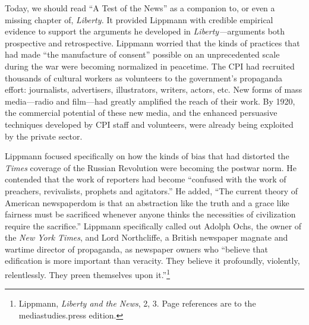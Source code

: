 \documentclass[openany,nobib,twoside,nohyper]{tufte-book}
\begin{document}
Today, we should read ``A Test of the News'' as a companion to, or even
a missing chapter of, \emph{Liberty.} It provided Lippmann with credible
empirical evidence to support the arguments he developed in
\emph{Liberty---}arguments both prospective and retrospective. Lippmann
worried that the kinds of practices that had made ``the manufacture of
consent'' possible on an unprecedented scale during the war were
becoming normalized in peacetime. The CPI had recruited thousands of
cultural workers as volunteers to the government's propaganda effort:
journalists, advertisers, illustrators, writers, actors, etc. New forms
of mass media---radio and film---had greatly amplified the reach of
their work. By 1920, the commercial potential of these new media, and
the enhanced persuasive techniques developed by CPI staff and
volunteers, were already being exploited by the private sector.

Lippmann focused specifically on how the kinds of bias that had
distorted the \emph{Times} coverage of the Russian Revolution were
becoming the postwar norm. He contended that the work of reporters had
become ``confused with the work of preachers, revivalists, prophets and
agitators.'' He added, ``The current theory of American newspaperdom is
that an abstraction like the truth and a grace like fairness must be
sacrificed whenever anyone thinks the necessities of civilization
require the sacrifice.'' Lippmann specifically called out Adolph Ochs,
the owner of the \emph{New York Times}, and Lord Northcliffe, a British
newspaper magnate and wartime director of propaganda, as newspaper
owners who ``believe that edification is more important than veracity.
They believe it profoundly, violently, relentlessly. They preen
themselves upon it.''\footnote{Lippmann, \emph{Liberty and the News}, 2, 3. Page references are
  to the mediastudies.press edition.}
\end{document}
